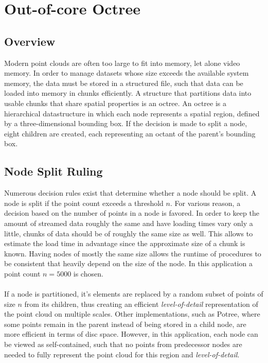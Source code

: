 \chapter{Out-of-core Octree}


\section{Overview}

Modern point clouds are often too large to fit into memory, let alone video memory. In order to manage datasets whose size exceeds the available system memory, the data must be stored in a structured file, such that data can be loaded into memory in chunks efficiently. A structure that partitions data into usable chunks that share spatial properties is an octree. 
An octree is a hierarchical datastructure in which each node represents a spatial region, defined by a three-dimensional bounding box. If the decision is made to split a node, eight children are created, each representing an octant of the parent's bounding box.


\section{Node Split Ruling}

Numerous decision rules exist that determine whether a node should be split. A node is split if the point count exceeds a threshold $n$.  For various reason, a decision based on the number of points in a node is favored. In order to keep the amount of streamed data roughly the same and have loading times vary only a little, chunks of data should be of roughly the same size as well. This allows to estimate the load time in advantage since the approximate size of a chunk is known. Having nodes of mostly the same size allows the runtime of procedures to be consistent that heavily depend on the size of the node.  In this application a point count $n = 5000$ is chosen. 
\\
\\
If a node is partitioned, it's elements are replaced by a random subset of points of size $n$ from its children, thus creating an efficient \textit{level-of-detail} representation of the point cloud on multiple scales. 
Other implementations, such as Potree\cite{SCHUETZ-2016-POT}, where some points remain in the parent instead of being stored in a child node, are more efficient in terms of disc space. However, in this application, each node can be viewed as self-contained, such that no points from predecessor nodes are needed to fully represent the point cloud for this region and \textit{level-of-detail}. 


